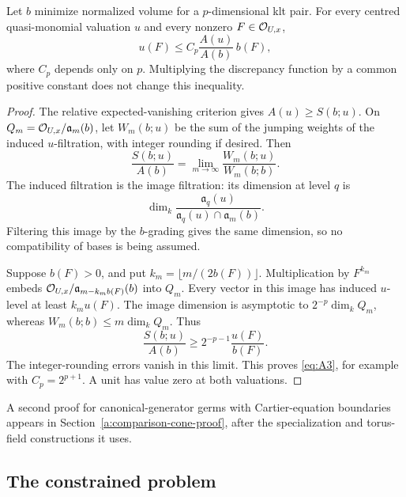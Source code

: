 \begin{lemma}\label{a:minimizer-comparison}
Let \(b\) minimize normalized volume for a \(p\)-dimensional klt pair.
For every centred quasi-monomial valuation \(u\) and every nonzero
\(F\in\mathcal O_{U,x}\),
\begin{equation}
               u(F)\leq C_p\frac{A(u)}{A(b)}\,b(F),
 \label{eq:A3}
\end{equation}
where \(C_p\) depends only on \(p\). Multiplying the discrepancy function
by a common positive constant does not change this inequality.
\end{lemma}

\begin{proof}
The relative expected-vanishing criterion
\cite[Lemma~3.3, Definition~3.4 and Theorem~3.10]{XuZhuangUniqueness}
gives \(A(u)\geq S(b;u)\). On
\(Q_m=\mathcal O_{U,x}/\mathfrak a_m(b)\), let \(W_m(b;u)\) be the sum of the
jumping weights of the induced \(u\)-filtration, with integer rounding
if desired. Then
\[
 \frac{S(b;u)}{A(b)}
       =\lim_{m\to\infty}\frac{W_m(b;u)}{W_m(b;b)}.
\]
The induced filtration is the image filtration: its dimension at level
\(q\) is
\[
 \dim_k\frac{\mathfrak a_q(u)}
               {\mathfrak a_q(u)\cap\mathfrak a_m(b)}.
\]
Filtering this image by the \(b\)-grading gives the same dimension, so
no compatibility of bases is being assumed.

Suppose \(b(F)>0\), and put
\(k_m=\lfloor m/(2b(F))\rfloor\).
Multiplication by \(F^{k_m}\) embeds
\(\mathcal O_{U,x}/\mathfrak a_{m-k_m b(F)}(b)\) into \(Q_m\).
Every vector in this image has induced \(u\)-level at least \(k_m u(F)\).
The image dimension is asymptotic to \(2^{-p}\dim_k Q_m\), whereas
\(W_m(b;b)\leq m\dim_k Q_m\).
Thus
\[
 \frac{S(b;u)}{A(b)}
       \geq 2^{-p-1}\frac{u(F)}{b(F)}.
\]
The integer-rounding errors vanish in this limit.
This proves \eqref{eq:A3}, for example with \(C_p=2^{p+1}\).
A unit has value zero at both valuations.
\end{proof}

A second proof for canonical-generator germs with Cartier-equation
boundaries appears in Section~\ref{a:comparison-cone-proof}, after the
specialization and torus-field constructions it uses.

\subsection{The constrained problem}

